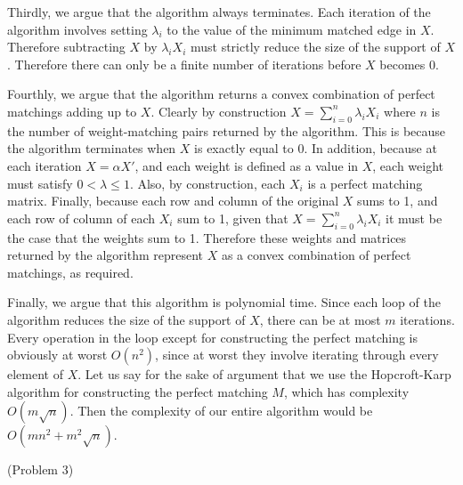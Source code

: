 \documentclass{hmcpset}
\begin{document}
\begin{solution}
\begin{enumerate}[label=(\Alph*)]
Thirdly, we argue that the algorithm always terminates. Each iteration of the
algorithm involves setting $\lambda_i$ to the value of the minimum matched
edge in $X$. Therefore subtracting $X$ by $\lambda_i X_i$ must strictly reduce
the size of the support of $X$. Therefore there can only be a finite number
of iterations before $X$ becomes 0.

Fourthly, we argue that the algorithm returns a convex combination of perfect
matchings adding up to $X$. Clearly by construction $X = \sum_{i = 0}^n{\lambda_i X_i}$
where $n$ is the number of weight-matching pairs returned by the algorithm.
This is because the algorithm terminates when $X$ is exactly equal to 0.
In addition, because at each iteration $X = \alpha X'$, and each weight is
defined as a value in $X$, each weight must satisfy $0 < \lambda \leq 1$.
Also, by construction, each $X_i$ is a perfect matching matrix.
Finally, because each row and column of the original $X$ sums to 1,
and each row of column of each $X_i$ sum to 1, given that
$X = \sum_{i = 0}^n{\lambda_i X_i}$ it must be the case that the weights
sum to 1. Therefore these weights and matrices returned by the algorithm
represent $X$ as a convex combination of perfect matchings, as required.

Finally, we argue that this algorithm is polynomial time. Since each loop
of the algorithm reduces the size of the support of $X$, there can be at
most $m$ iterations. Every operation in the loop except for constructing
the perfect matching is obviously at worst $O(n^2)$, since at worst they
involve iterating through every element of $X$. Let us say for the sake of
argument that we use the Hopcroft-Karp algorithm for constructing the
perfect matching $M$, which has complexity $O(m\sqrt{n})$. Then the
complexity of our entire algorithm would be $O(mn^2 + m^2\sqrt{n})$.

\end{enumerate}
\end{solution}
\begin{problem}[3]
(Problem 3)
\end{problem}
\end{document}
